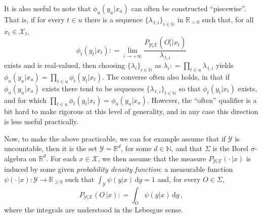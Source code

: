 \documentclass[twoside,11pt]{article}
\newcommand{\nats}{\mathbb{N}}
\newcommand{\reals}{\mathbb{R}}
\newcommand{\realspos}{\reals_{>0}}
\newcommand{\realsnonneg}{\reals_{\geq 0}}
\newcommand{\states}{\mathcal{X}}
\newcommand{\observs}{\mathcal{Y}}
\newcommand{\coloneqq}{:\!=}
\begin{document}
It is also useful to note that $\phi_u(y_u\vert x_u)$ can often be constructed ``piecewise''. That is, if for every $t\in u$ there is a sequence $\{\lambda_{\,t,i}\}_{i\in\nats}$ in $\realspos$ such that, for all $x_t\in\states_t$,
\begin{equation*}
\phi_t(y_t\vert x_t)\coloneqq \lim_{i\to+\infty} \frac{P_{\observs\vert\states}(O_t^i\vert x_t)}{\lambda_{\,t,i}}
\end{equation*}
exists and is real-valued, then choosing $\{\lambda_i\}_{i\in\nats}$ as $\lambda_i\coloneqq \prod_{t\in u}\lambda_{\,t,i}$ yields $\phi_u(y_u\vert x_u)=\prod_{t\in u}\phi_t(y_t\vert x_t)$. The converse often also holds, in that if $\phi_u(y_u\vert x_u)$ exists there tend to be sequences $\{\lambda_{\,t,i}\}_{t\in\nats}$ so that $\phi_t(y_t\vert x_t)$ exists, and for which $\prod_{t\in u}\phi_t(y_t\vert x_t)=\phi_u(y_u\vert x_u)$. However, the ``often'' qualifier is a bit hard to make rigorous at this level of generality, and in any case this direction is less useful practically. %

Now, to make the above practicable, we can for example assume that if $\observs$ is uncountable, then it is the set $\observs=\reals^d$, for some $d\in\nats$, and that $\Sigma$ is the Borel $\sigma$-algebra on $\reals^d$. 
For each $x\in\states$, we then assume that the measure $P_{\observs\vert\states}(\cdot\,\vert x)$ is induced by some given \emph{probability density function}: a measurable function $\psi(\cdot\,\vert x):\observs\to\realsnonneg$ such that $\int_\observs \psi(y\vert x)\,\mathrm{d}y=1$ and, for every $O\in\Sigma$,
\begin{equation*}
P_{\observs\vert\states}(O\,\vert x) \coloneqq \int_O \psi(y\vert x)\,\mathrm{d}y\,,
\end{equation*}
where the integrals are understood in the Lebesgue sense.
\end{document}
